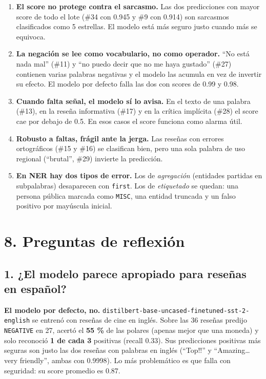 \documentclass[12pt,a4paper]{article}
\begin{document}
\begin{enumerate}[leftmargin=1.4em]
\item
  \textbf{El score no protege contra el sarcasmo.} Las dos predicciones con mayor score de todo el
  lote (\#34 con 0.945 y \#9 con 0.914) son sarcasmos clasificados como 5 estrellas. El modelo está
  más seguro justo cuando más se equivoca.
\item
  \textbf{La negación se lee como vocabulario, no como operador.} ``No está nada mal'' (\#11) y
  ``no puedo decir que no me haya gustado'' (\#27) contienen varias palabras negativas y el modelo las
  acumula en vez de invertir su efecto. El modelo por defecto falla las dos con scores de 0.99 y 0.98.
\item
  \textbf{Cuando falta señal, el modelo sí lo avisa.} En el texto de una palabra (\#13), en la reseña
  informativa (\#17) y en la crítica implícita (\#28) el score cae por debajo de 0.5. En esos casos el
  score funciona como alarma útil.
\item
  \textbf{Robusto a faltas, frágil ante la jerga.} Las reseñas con errores ortográficos (\#15 y \#16) se
  clasifican bien, pero una sola palabra de uso regional (``brutal'', \#29) invierte la predicción.
\item
  \textbf{En NER hay dos tipos de error.} Los de \emph{agregación} (entidades partidas en subpalabras)
  desaparecen con \texttt{first}. Los de \emph{etiquetado} se quedan: una persona pública marcada como \texttt{MISC},
  una entidad truncada y un falso positivo por mayúscula inicial.
\end{enumerate}


\section{8. Preguntas de reflexión}

\subsection{1. ¿El modelo parece apropiado para reseñas en español?}

\textbf{El modelo por defecto, no.} \texttt{distilbert-base-uncased-finetuned-sst-2-english} se entrenó con
reseñas de cine en inglés. Sobre las 36 reseñas predijo \texttt{NEGATIVE} en 27, acertó el \textbf{55 \%} de
las polares (apenas mejor que una moneda) y solo reconoció \textbf{1 de cada 3} positivas (recall 0.33).
Sus predicciones positivas más seguras son justo las dos reseñas con palabras en inglés (``Top!!'' y
``Amazing\ldots{} very friendly'', ambas con 0.9998).
Lo más problemático es que falla con seguridad: su score promedio es 0.87.
\end{document}
